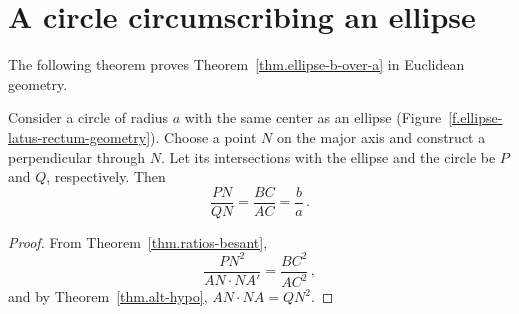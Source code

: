 \section{A circle circumscribing an ellipse}

The following theorem proves Theorem~\ref{thm.ellipse-b-over-a} in Euclidean geometry.
\begin{theorem}\label{thm.ellipse-b-over-a-besant}
Consider a circle of radius $a$ with the same center as an ellipse (Figure~\ref{f.ellipse-latus-rectum-geometry}). Choose a point $N$ on the major axis and construct a perpendicular through $N$. Let its intersections with the ellipse and the circle be $P$ and $Q$, respectively. Then
\[
\frac{PN}{QN}=\frac{BC}{AC}=\frac{b}{a}\,.
\]
\end{theorem}
\begin{proof} 
From Theorem~\ref{thm.ratios-besant},
\[
\frac{PN^2}{AN\cdot NA'} = \frac{BC^2}{AC^2}\,,
\]
and by Theorem~\ref{thm.alt-hypo}, $AN\cdot NA=QN^2$.\hqed
\end{proof}



